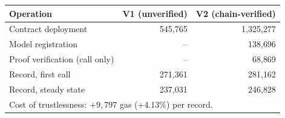 \begin{tabular}{lrr}
\toprule
\textbf{Operation} & \textbf{V1 (unverified)} & \textbf{V2 (chain-verified)} \\
\midrule
Contract deployment & 545{,}765 & 1{,}325{,}277 \\
Model registration & -- & 138{,}696 \\
Proof verification (call only) & -- & 68{,}869 \\
\midrule
Record, first call & 271{,}361 & 281{,}162 \\
Record, steady state & 237{,}031 & 246{,}828 \\
\bottomrule
\multicolumn{3}{l}{\footnotesize Cost of trustlessness: $+9{,}797$ gas (+4.13\%) per record.} \\
\end{tabular}

